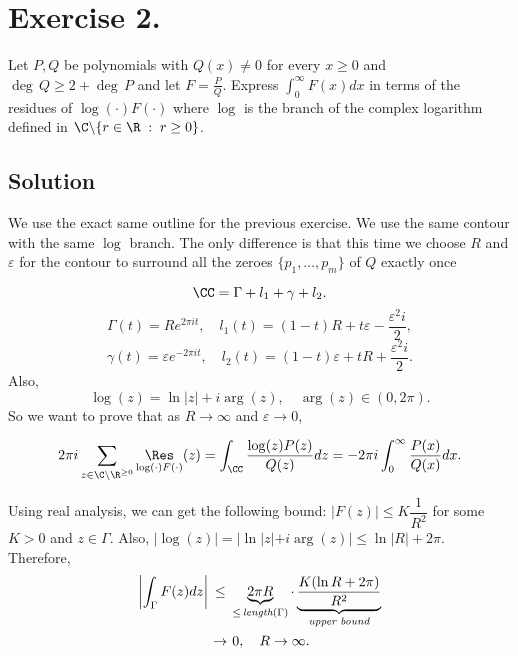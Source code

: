 \section*{Exercise 2.}

Let $P,Q$ be polynomials with $Q(x) \neq 0$ for every $x \geq 0$ and $\deg\, Q \geq 2 + \deg\, P$ and let $F = \frac{P}{Q}$. Express $\displaystyle \int_0^{\infty} F(x) dx$ in terms of the residues of $\log(\cdot) F(\cdot)$ where $\log$ is the branch of the complex logarithm defined in $\C \backslash \{r\in \R \;:\; r \geq 0\}$.

\subsection*{Solution}

We use the exact same outline for the previous exercise. We use the same contour with the same $\log$ branch. The only difference is that this time we choose $R$ and $\varepsilon$ for the contour to surround all the zeroes $\{p_1,\ldots, p_m\}$ of $Q$ exactly once
\begin{multicols}{2}
    \vspace*{1em}
    \begin{figure}[H]
        \centering
        
    \end{figure} 
    \[ \CC = \Gamma + l_1 + \gamma + l_2. \]
    \[ \Gamma(t) = R e^{2\pi i t},\hspace{1em} l_1(t) = (1-t)R + t \varepsilon - \frac{\varepsilon^2 i}{2}, \]
    \[ \gamma(t) = \varepsilon e^{-2\pi i t}, \hspace{1em} l_2(t) = (1-t)\varepsilon + t R + \frac{\varepsilon^2 i}{2}. \]
    Also,
    \[ \log(z) = \ln|z| + i \arg(z),\hspace{1em} \arg(z) \in (0,2 \pi). \]
    So we want to prove that as $R\to \infty$ and $\varepsilon \to 0$,
\end{multicols}
\[ 2\pi i \sum_{z \in \C\backslash \R^{\geq 0}}\underset{{\log(\cdot)F(\cdot)}}{\Res}(z) = \int_{\CC} \frac{\log(z) P(z)}{Q(z)} dz = -2\pi i \int_{0}^{\infty} \frac{P(x)}{Q(x)} dx. \]

Using real analysis, we can get the following bound: $|F(z)| \leq K\dfrac{1}{R^2}$ for some $K > 0$ and $z \in \Gamma$. Also, $|\log(z)| = |\ln |z| + i \arg(z)| \leq \ln|R| + 2\pi$. Therefore,
\[ \everymath{\displaystyle}
\arraycolsep=1.8pt\def\arraystretch{1.5}
\begin{array}{rcl}
    \left| \int_{\Gamma} F(z) dz \right| & \leq & \underbrace{2\pi R}_{\leq\,\textit{length}(\Gamma)} \cdot \underbrace{\frac{K (\ln R + 2\pi)}{R^2}}_{\textit{upper bound}}\\
    & \to & 0,\hspace{1em} R\to \infty.
\end{array} \]

